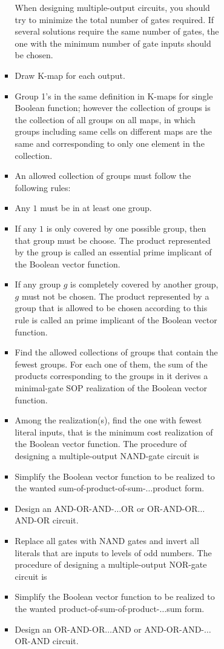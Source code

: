 \documentclass[a4paper,12pt]{article}
\begin{document}
\begin{itemize}
\begin{itemize}
\begin{itemize}
\begin{itemize}
\begin{itemize}
\begin{itemize}
\begin{itemize}
When designing multiple-output circuits, you should try to minimize the total number of gates required. If several solutions require the same number of gates, the one with the minimum number of gate inputs should be chosen.
\ben
\item Draw K-map for each output.
\item Group 1's in the same definition in K-maps for single Boolean function; however the collection of groups is the collection of all groups on all maps, in which groups including same cells on different maps are the same and corresponding to only one element in the collection.
\item An allowed collection of groups must follow the following rules:
\bit
\item Any $1$ must be in at least one group.
\item If any $1$ is only covered by one possible group, then that group must be choose. The product represented by the group is called an essential prime implicant of the Boolean vector function.
\item If any group $g$ is completely covered by another group, $g$ must not be chosen. The product represented by a group that is allowed to be chosen according to this rule is called an prime implicant of the Boolean vector function.
\eit
\item Find the allowed collections of groups that contain the fewest groups. For each one of them, the sum of the products corresponding to the groups in it derives a minimal-gate SOP realization of the Boolean vector function.
\item Among the realization(s), find the one with fewest literal inputs, that is the minimum cost realization of the Boolean vector function.
\een
{}
The procedure of designing a multiple-output NAND-gate circuit is
\ben
\item Simplify the Boolean vector function to be realized to the wanted sum-of-product-of-sum-$\ldots$product form.
\item Design an AND-OR-AND-$\ldots$OR or OR-AND-OR$\ldots$AND-OR circuit.
\item Replace all gates with NAND gates and invert all literals that are inputs to levels of odd numbers.
\een
The procedure of designing a multiple-output NOR-gate circuit is
\ben
\item Simplify the Boolean vector function to be realized to the wanted product-of-sum-of-product-$\ldots$sum form.
\item Design an OR-AND-OR$\ldots$AND or AND-OR-AND-$\ldots$OR-AND circuit.

\end{itemize}
\end{itemize}
\end{itemize}
\end{itemize}
\end{itemize}
\end{itemize}
\end{itemize}
\end{document}
